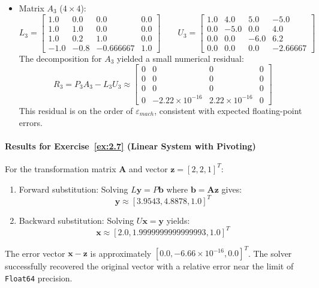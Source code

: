 \begin{solution}
\begin{itemize}
		\item Matrix $A_3$ ($4\times4$):
		      \[
			      L_3 = \begin{bmatrix}
				      1.0  & 0.0  & 0.0       & 0.0 \\
				      1.0  & 1.0  & 0.0       & 0.0 \\
				      1.0  & 0.2  & 1.0       & 0.0 \\
				      -1.0 & -0.8 & -0.666667 & 1.0
			      \end{bmatrix} \qquad
			      U_3 = \begin{bmatrix}
				      1.0 & 4.0  & 5.0  & -5.0     \\
				      0.0 & -5.0 & 0.0  & 4.0      \\
				      0.0 & 0.0  & -6.0 & 6.2      \\
				      0.0 & 0.0  & 0.0  & -2.66667
			      \end{bmatrix}
		      \]
		      The decomposition for $A_3$ yielded a small numerical residual:
		      \[
			      R_3 = P_3 A_3 - L_3 U_3 \approx \begin{bmatrix}
				      0 & 0                   & 0                  & 0 \\
				      0 & 0                   & 0                  & 0 \\
				      0 & 0                   & 0                  & 0 \\
				      0 & -2.22\times10^{-16} & 2.22\times10^{-16} & 0
			      \end{bmatrix}
		      \]
		      This residual is on the order of $\varepsilon_{mach}$, consistent with
		      expected floating-point errors.
	\end{itemize}

	\paragraph{Results for Exercise~\ref{ex:2.7} (Linear System with Pivoting)}
	For the transformation matrix $\mathbf{A}$ and vector $\mathbf{z} = [2, 2, 1]^T$:
	\begin{enumerate}
		\item Forward substitution: Solving $L\mathbf{y} = P\mathbf{b}$
		      where $\mathbf{b} = \mathbf{Az}$ gives:
		      \[
			      \mathbf{y} \approx [3.9543, 4.8878, 1.0]^T
		      \]
		\item Backward substitution: Solving $U\mathbf{x} = \mathbf{y}$ yields:
		      \[
			      \mathbf{x} \approx [2.0, 1.9999999999999993, 1.0]^T
		      \]
	\end{enumerate}
	The error vector $\mathbf{x} - \mathbf{z}$ is approximately $[0.0, -6.66
			\times 10^{-16}, 0.0]^T$. The solver successfully recovered the original vector
	with a relative error near the limit of \texttt{Float64} precision.


\end{solution}
